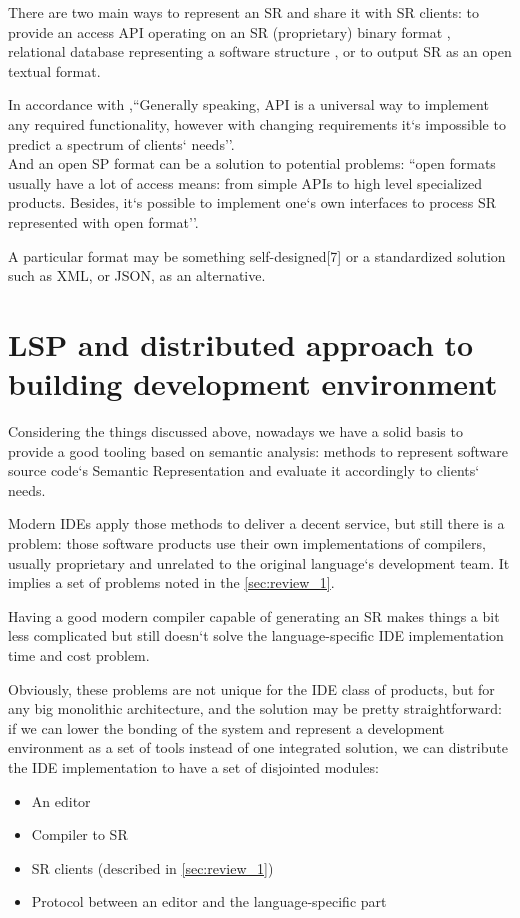 There are two main ways to represent an SR and share it with SR clients: to
provide an access API operating on an SR (proprietary) binary format \cite{Cannon, FreeSoftwareFoundation2016},
relational database representing a software structure \cite{Linton1983}, or to output SR as an
open textual format\cite{TheRustTeam2016}.

In accordance with \cite{Zouev2005},``Generally speaking, API is a universal way to implement any required
functionality, however with changing requirements it`s impossible to predict a
spectrum of clients` needs''.\\
And an open SP format can be a solution to potential problems: ``open formats
usually have a lot of access means: from simple APIs to high level specialized
products. Besides, it`s possible to implement one`s own interfaces to process SR
represented with open format''.

A particular format may be something self-designed[7] or a standardized
solution such as XML\cite{Germon}, or JSON\cite{ECMA-4042013}, as an alternative.

\newpage
\section{LSP and distributed approach to building development
environment}
\label{sec:review_3}

Considering the things discussed above, nowadays we have a solid basis to
provide a good tooling based on semantic analysis: methods to represent
software source code`s Semantic Representation and evaluate it accordingly to
clients` needs.

Modern IDEs apply those methods to deliver a decent service, but still there is a
problem: those software products use their own implementations of compilers,
usually proprietary and unrelated to the original language`s development team.
It implies a set of problems noted in the \ref{sec:review_1}.

Having a good modern compiler capable of generating an SR makes things a bit
less complicated but still doesn`t solve the language-specific IDE
implementation time and cost problem.

Obviously, these problems are not unique for the IDE class of products, but for
any big monolithic architecture, and the solution may be pretty straightforward:
if we can lower the bonding of the system and represent a development
environment as a set of tools instead of one integrated solution, we can
distribute the IDE implementation to have a set of disjointed modules:
\begin{itemize}
    \item An editor
    \item Compiler to SR
    \item SR clients (described in \ref{sec:review_1})
    \item Protocol between an editor and the language-specific part
\end{itemize}
\newpage

